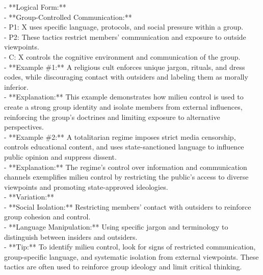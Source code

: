 \documentclass[a4paper,12pt,single,pdftex]{scrartcl}
\begin{document}
    
      - **Logical Form:**
    \\

    
        - **Group-Controlled Communication:**
    \\

    
          - P1: X uses specific language, protocols, and social pressure within a group.
    \\

    
          - P2: These tactics restrict members' communication and exposure to outside viewpoints.
    \\

    
          - C: X controls the cognitive environment and communication of the group.
    \\

    
      - **Example \#1:** A religious cult enforces unique jargon, rituals, and dress codes, while discouraging contact with outsiders and labeling them as morally inferior.
    \\

    
      - **Explanation:** This example demonstrates how milieu control is used to create a strong group identity and isolate members from external influences, reinforcing the group’s doctrines and limiting exposure to alternative perspectives.
    \\

    
      - **Example \#2:** A totalitarian regime imposes strict media censorship, controls educational content, and uses state-sanctioned language to influence public opinion and suppress dissent.
    \\

    
      - **Explanation:** The regime’s control over information and communication channels exemplifies milieu control by restricting the public’s access to diverse viewpoints and promoting state-approved ideologies.
    \\

    
      - **Variation:**
    \\

    
        - **Social Isolation:** Restricting members' contact with outsiders to reinforce group cohesion and control.
    \\

    
        - **Language Manipulation:** Using specific jargon and terminology to distinguish between insiders and outsiders.
    \\

    
      - **Tip:** To identify milieu control, look for signs of restricted communication, group-specific language, and systematic isolation from external viewpoints. These tactics are often used to reinforce group ideology and limit critical thinking.
    \\
\end{document}
